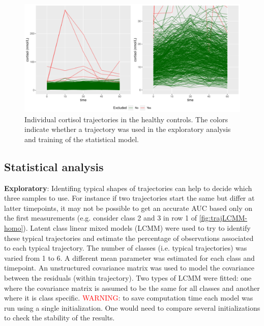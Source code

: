 \documentclass[12pt]{article}
\begin{document}
\begin{figure}[!h]
\centering
\includegraphics[width=\textwidth]{./figures/cortisol-individual-alltraj.pdf}
\caption{\label{fig:alltraj-HC}Individual cortisol trajectories in the healthy controls. The colors indicate whether a trajectory was used in the exploratory analysis and training of the statistical model.}
\end{figure} 

\subsection{Statistical analysis}
\label{sec:org449381c}

\textbf{Exploratory}: Identifing typical shapes of trajectories can help to
decide which three samples to use. For instance if two trajectories
start the same but differ at latter timepoints, it may not be possible
to get an accurate AUC based only on the first measurements
(e.g. consider class 2 and 3 in row 1 of
\autoref{fig:trajLCMM-homo}). Latent class linear mixed models (LCMM)
were used to try to identify these typical trajectories and estimate
the percentage of observations associated to each typical trajectory.
The number of classes (i.e. typical trajectories) was varied from 1
to 6. A different mean parameter was estimated for each class and
timepoint. An unstructured covariance matrix was used to model the
covariance between the residuals (within trajectory). Two types of
LCMM were fitted: one where the covariance matrix is assumed to be the
same for all classes and another where it is class specific. \newline
\textcolor{red}{WARNING}: to save computation time each
model was run using a single initialization. One would need to compare
several initializations to check the stability of the results.

\bigskip
\end{document}
